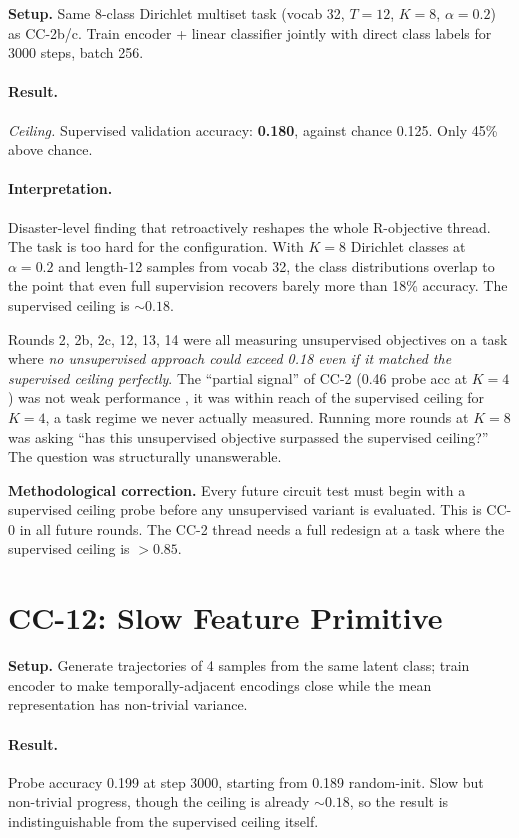 \documentclass[10pt, twocolumn, a4paper]{article}
\begin{document}
\textbf{Setup.} Same 8-class Dirichlet multiset task (vocab 32, $T=12$, $K=8$, $\alpha=0.2$) as CC-2b/c. Train encoder + linear classifier jointly with direct class labels for 3000 steps, batch 256.

\paragraph{Result.} \emph{Ceiling.} Supervised validation accuracy: \textbf{0.180}, against chance 0.125. Only 45\% above chance.

\paragraph{Interpretation.} Disaster-level finding that retroactively reshapes the whole R-objective thread. The task is too hard for the configuration. With $K=8$ Dirichlet classes at $\alpha=0.2$ and length-12 samples from vocab 32, the class distributions overlap to the point that even full supervision recovers barely more than 18\% accuracy. The supervised ceiling is $\sim 0.18$.

Rounds 2, 2b, 2c, 12, 13, 14 were all measuring unsupervised objectives on a task where \emph{no unsupervised approach could exceed 0.18 even if it matched the supervised ceiling perfectly}. The ``partial signal'' of CC-2 (0.46 probe acc at $K=4$) was not weak performance ,  it was within reach of the supervised ceiling for $K=4$, a task regime we never actually measured. Running more rounds at $K=8$ was asking ``has this unsupervised objective surpassed the supervised ceiling?'' The question was structurally unanswerable.

\textbf{Methodological correction.} Every future circuit test must begin with a supervised ceiling probe before any unsupervised variant is evaluated. This is CC-0 in all future rounds. The CC-2 thread needs a full redesign at a task where the supervised ceiling is $> 0.85$.

\section{CC-12: Slow Feature Primitive}

\textbf{Setup.} Generate trajectories of 4 samples from the same latent class; train encoder to make temporally-adjacent encodings close while the mean representation has non-trivial variance.

\paragraph{Result.} Probe accuracy 0.199 at step 3000, starting from 0.189 random-init. Slow but non-trivial progress, though the ceiling is already $\sim 0.18$, so the result is indistinguishable from the supervised ceiling itself.
\end{document}
